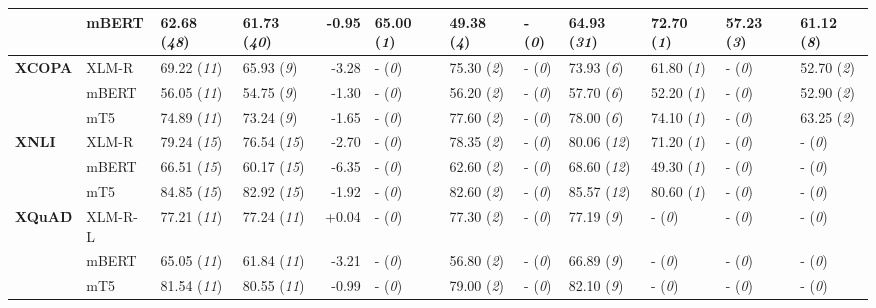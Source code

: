 \begin{tabular}{ll||llr|lllllll}
	 & mBERT & 62.68 (\textit{48}) & 61.73 (\textit{40}) & -0.95 & \cellcolor{low-color!40}  65.00 (\textit{1}) &  49.38 (\textit{4}) & - (\textit{0}) & \cellcolor{high-color!40}  64.93 (\textit{31}) & \cellcolor{low-color!40}  72.70 (\textit{1}) &  57.23 (\textit{3}) &  61.12 (\textit{8}) \\\midrule
	\multirow{3}{*}{\textbf{XCOPA}\acc} & XLM-R & 69.22 (\textit{11}) & 65.93 (\textit{9}) & -3.28 & - (\textit{0}) &  75.30 (\textit{2}) & - (\textit{0}) & \cellcolor{high-color!40}  73.93 (\textit{6}) & \cellcolor{low-color!40}  61.80 (\textit{1}) & - (\textit{0}) &  52.70 (\textit{2}) \\
	 & mBERT & 56.05 (\textit{11}) & 54.75 (\textit{9}) & -1.30 & - (\textit{0}) &  56.20 (\textit{2}) & - (\textit{0}) & \cellcolor{high-color!40}  57.70 (\textit{6}) & \cellcolor{low-color!40}  52.20 (\textit{1}) & - (\textit{0}) &  52.90 (\textit{2}) \\
	 & mT5 & 74.89 (\textit{11}) & 73.24 (\textit{9}) & -1.65 & - (\textit{0}) &  77.60 (\textit{2}) & - (\textit{0}) & \cellcolor{high-color!40}  78.00 (\textit{6}) & \cellcolor{low-color!40}  74.10 (\textit{1}) & - (\textit{0}) &  63.25 (\textit{2}) \\\midrule
	\multirow{3}{*}{\textbf{XNLI}\acc} & XLM-R & 79.24 (\textit{15}) & 76.54 (\textit{15}) & -2.70 & - (\textit{0}) &  78.35 (\textit{2}) & - (\textit{0}) & \cellcolor{high-color!40}  80.06 (\textit{12}) & \cellcolor{low-color!40}  71.20 (\textit{1}) & - (\textit{0}) & - (\textit{0}) \\
	 & mBERT & 66.51 (\textit{15}) & 60.17 (\textit{15}) & -6.35 & - (\textit{0}) &  62.60 (\textit{2}) & - (\textit{0}) & \cellcolor{high-color!40}  68.60 (\textit{12}) & \cellcolor{low-color!40}  49.30 (\textit{1}) & - (\textit{0}) & - (\textit{0}) \\
	 & mT5 & 84.85 (\textit{15}) & 82.92 (\textit{15}) & -1.92 & - (\textit{0}) &  82.60 (\textit{2}) & - (\textit{0}) & \cellcolor{high-color!40}  85.57 (\textit{12}) & \cellcolor{low-color!40}  80.60 (\textit{1}) & - (\textit{0}) & - (\textit{0}) \\\midrule
	\multirow{3}{*}{\textbf{XQuAD}\f} & XLM-R-L & 77.21 (\textit{11}) & 77.24 (\textit{11}) & +0.04 & - (\textit{0}) & \cellcolor{low-color!40}  77.30 (\textit{2}) & - (\textit{0}) & \cellcolor{high-color!40}  77.19 (\textit{9}) & - (\textit{0}) & - (\textit{0}) & - (\textit{0}) \\
	 & mBERT & 65.05 (\textit{11}) & 61.84 (\textit{11}) & -3.21 & - (\textit{0}) & \cellcolor{low-color!40}  56.80 (\textit{2}) & - (\textit{0}) & \cellcolor{high-color!40}  66.89 (\textit{9}) & - (\textit{0}) & - (\textit{0}) & - (\textit{0}) \\
	 & mT5 & 81.54 (\textit{11}) & 80.55 (\textit{11}) & -0.99 & - (\textit{0}) & \cellcolor{low-color!40}  79.00 (\textit{2}) & - (\textit{0}) & \cellcolor{high-color!40}  82.10 (\textit{9}) & - (\textit{0}) & - (\textit{0}) & - (\textit{0}) \\
	 \bottomrule
\end{tabular}